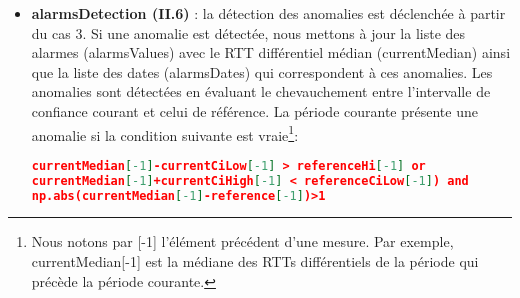 \begin{itemize}
\begin{enumerate}
\begin{itemize}
\item  soit \textit{aggr\_median} la médiane de tous les RTTs différentiels médians de référence calculés pour toutes les périodes précédentes. 
	
\item 	soit \textit{aggr\_ciLow} la médiane de     toutes les bornes inférieures calculées pendant les périodes précédentes.
	
\item 	soit \textit{aggr\_ciHigh} la médiane de     toutes les bornes inférieures calculées pendant les périodes précédentes.

\end{itemize}

	
	\item Cas $3$ : une fois la référence est assez représentable, nous mettons à jour cette dernière comme suit \footnote{Nous précisons que $ var[-1] $ dénote la dernière valeur que $ var $  avait. }:
	\begin{align}
		referenceMedian &=  0.99*referenceMedian[-1]+0.01*currentMedian \\
		 referenceCiLow &=	 0.99*referenceLow[-1]+0.01*rttDiffL \\
	referenceCiHight &=  0.99*referenceHight[-1]+0.01*rttDiffH
	\end{align}

	   
	

\end{enumerate}
 \item \textbf{ alarmsDetection (II.6) }:   la détection des anomalies est déclenchée à partir du cas $3$. Si une anomalie est détectée, nous mettons à jour la liste des alarmes  {\color{gray}(alarmsValues)} avec le RTT différentiel médian (currentMedian) ainsi que la
 liste des dates  {\color{gray}(alarmsDates)} qui correspondent à ces anomalies. Les anomalies sont détectées en évaluant le chevauchement entre l'intervalle de confiance courant et celui de référence. La période courante présente une anomalie si la condition suivante est vraie\footnote{Nous notons par [-1] l'élément précédent d'une mesure. Par exemple, currentMedian[-1] est la médiane des RTTs différentiels de la période qui précède la période courante.}:
 \begin{lstlisting}[language=json,firstnumber=1, caption={Conditions de présence d'une anomalie pour un lien},
 basicstyle =\footnotesize]
currentMedian[-1]-currentCiLow[-1] > referenceHi[-1] or
currentMedian[-1]+currentCiHigh[-1] < referenceCiLow[-1]) and
np.abs(currentMedian[-1]-reference[-1])>1
 \end{lstlisting}

 
 
  \end{itemize}

